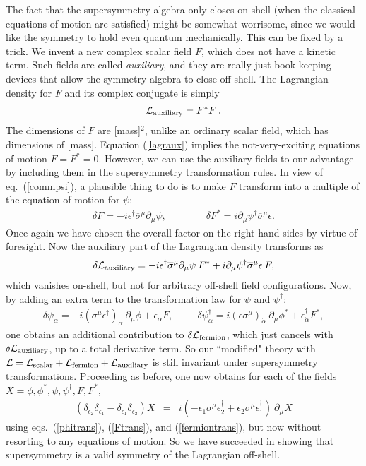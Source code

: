 \documentclass[11pt]{article}
\def\beq{\begin{eqnarray}}
\def\eeq{\end{eqnarray}}
\def\lagr{{\cal L}}
\def\deltaeps{\delta}
\def\sigmabar{\overline\sigma}
\begin{document}
The fact that the supersymmetry algebra only closes on-shell (when the
classical equations of motion are satisfied) might be somewhat worrisome,
since we would like the symmetry to hold even quantum mechanically. This
can be fixed by a trick. We invent a new complex scalar field $F$, which
does not have a kinetic term. Such fields are called {\it auxiliary}, and
they are really just book-keeping devices that allow the symmetry algebra
to close off-shell. The Lagrangian density for $F$ and its complex
conjugate is simply
\beq
\lagr_{\rm auxiliary} = F^* F \> .
\label{lagraux}
\eeq
The dimensions of $F$ are [mass]$^2$, unlike an ordinary scalar field,
which has dimensions of [mass]. Equation (\ref{lagraux}) implies the
not-very-exciting equations of motion $F=F^*=0$. However, we can use the
auxiliary fields to our advantage by including them in the supersymmetry
transformation rules. In view of eq.~(\ref{commpsi}), a plausible thing to
do is to make $F$ transform into a multiple of the equation of motion for
$\psi$: 
\beq
\deltaeps F = - i \epsilon^\dagger \sigmabar^\mu \partial_\mu \psi,
\qquad\qquad
\deltaeps F^* = i\partial_\mu \psi^\dagger \sigmabar^\mu \epsilon .
\label{Ftrans}
\eeq
Once again we have chosen the overall factor on the right-hand sides by
virtue of foresight. Now the auxiliary part of the Lagrangian density
transforms as
\beq
\delta \lagr_{\rm auxiliary} = 
-i \epsilon^\dagger \sigmabar^\mu \partial_\mu \psi \> F^* 
+i \partial_\mu \psi^\dagger \sigmabar^\mu \epsilon \> F ,
\eeq
which vanishes on-shell, but not for arbitrary off-shell field
configurations. Now, by adding an extra term to
the transformation law for $\psi$ and $\psi^\dagger$:
\beq
\delta \psi_\alpha =
- i (\sigma^\mu \epsilon^\dagger)_{\alpha}\> \partial_\mu\phi 
+ \epsilon_\alpha F,
\qquad\>\>
\delta \psi_{\dot{\alpha}}^\dagger =
i (\epsilon\sigma^\mu)_{\dot{\alpha}}\> \partial_\mu \phi^* 
+ \epsilon^\dagger_{\dot{\alpha}} F^* ,
\label{fermiontrans}
\eeq
one obtains an additional contribution to $\deltaeps \lagr_{\rm fermion}$,
which just cancels with $\deltaeps \lagr_{\rm auxiliary}$, up to a total
derivative term. So our ``modified" theory with $\lagr = \lagr_{\rm
scalar} +\lagr_{\rm fermion} + \lagr_{\rm auxiliary}$ is still invariant
under supersymmetry transformations. Proceeding as before, one now obtains
for each of the fields $X=\phi,\phi^*,\psi,\psi^\dagger,F,F^*$,
\beq
(\delta_{\epsilon_2} \delta_{\epsilon_1} -
\delta_{\epsilon_1} \delta_{\epsilon_2}) X &=&
i (-\epsilon_1 \sigma^\mu \epsilon_2^\dagger +
   \epsilon_2 \sigma^\mu \epsilon_1^\dagger) \> \partial_\mu X
\label{anytrans}
\eeq
using eqs.~(\ref{phitrans}), (\ref{Ftrans}), and (\ref{fermiontrans}), but
now without resorting to any equations of motion. So we have
succeeded in showing that supersymmetry is a valid symmetry of the
Lagrangian off-shell.
\end{document}
